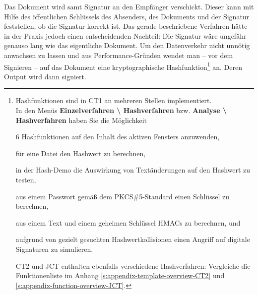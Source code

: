 \begin{refsegment}
Das Dokument wird samt Signatur an den Empfänger verschickt. Dieser kann
mit Hilfe des öffentlichen Schlüssels des Absenders, des Dokuments und
der Signatur feststellen, ob die Signatur korrekt ist.
Das gerade beschriebene Verfahren hätte in der Praxis jedoch einen
entscheidenden Nachteil: Die Signatur wäre ungefähr genauso lang wie das
eigentliche Dokument. Um den Datenverkehr nicht unnötig anwachsen zu
lassen und aus Performance-Gründen wendet man -- vor
dem Signieren -- auf das Dokument eine kryptographische
Hashfunktion\footnote{%
Hashfunktionen sind in CT1
an mehreren Stellen implementiert.\\
In den Menüs {\bf Einzelverfahren \textbackslash{} Hashverfahren} bzw.
              {\bf Analyse \textbackslash{} Hashverfahren}
haben Sie die Möglichkeit
\begin{list}{\textbullet}{\addtolength{\itemsep}{-1.0\baselineskip}}
\item 6 Hashfunktionen auf den Inhalt des aktiven Fensters anzuwenden,\\
\item für eine Datei den Hashwert zu berechnen,\\
\item in der Hash-Demo die Auswirkung von Textänderungen auf den
      Hashwert zu testen,\\
\item aus einem Passwort gemäß dem PKCS\#5-Standard
      einen Schlüssel zu berechnen,\\
\item aus einem Text und einem geheimen Schlüssel HMACs zu berechnen, und\\
\item aufgrund von gezielt gesuchten Hashwertkollisionen
      einen Angriff auf digitale Signaturen zu simulieren.
\end{list}
CT2 und JCT enthalten ebenfalls verschiedene
Hashverfahren: Vergleiche die Funktionenliste im Anhang
\ref{s:appendix-template-overview-CT2} und
\ref{s:appendix-function-overview-JCT}.
} an. Deren Output wird dann signiert.



\hypertarget{Hash-functions-ht}{}

\end{refsegment}
